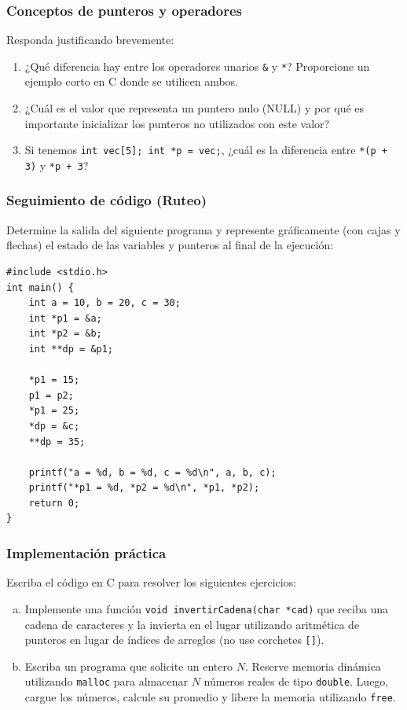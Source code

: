 \begin{ejercicioClase}
    \subsubsection{Conceptos de punteros y operadores}
    Responda justificando brevemente:
    \begin{enumerate}[label=\alph*)]
        \item ¿Qué diferencia hay entre los operadores unarios \texttt{\&} y \texttt{*}? Proporcione un ejemplo corto en C donde se utilicen ambos.
        \item ¿Cuál es el valor que representa un puntero nulo (NULL) y por qué es importante inicializar los punteros no utilizados con este valor?
        \item Si tenemos \texttt{int vec[5]; int *p = vec;}, ¿cuál es la diferencia entre \texttt{*(p + 3)} y \texttt{*p + 3}?
    \end{enumerate}

    \subsubsection{Seguimiento de código (Ruteo)}
    Determine la salida del siguiente programa y represente gráficamente (con cajas y flechas) el estado de las variables y punteros al final de la ejecución:
    \begin{lstlisting}[style=customc, basicstyle=\ttfamily\small]
#include <stdio.h>
int main() {
    int a = 10, b = 20, c = 30;
    int *p1 = &a;
    int *p2 = &b;
    int **dp = &p1;

    *p1 = 15;
    p1 = p2;
    *p1 = 25;
    *dp = &c;
    **dp = 35;

    printf("a = %d, b = %d, c = %d\n", a, b, c);
    printf("*p1 = %d, *p2 = %d\n", *p1, *p2);
    return 0;
}
    \end{lstlisting}

    \subsubsection{Implementación práctica}
    Escriba el código en C para resolver los siguientes ejercicios:
    \begin{enumerate}[a)]
        \item Implemente una función \texttt{void invertirCadena(char *cad)} que reciba una cadena de caracteres y la invierta en el lugar utilizando aritmética de punteros en lugar de índices de arreglos (no use corchetes \texttt{[]}).
        \item Escriba un programa que solicite un entero $N$. Reserve memoria dinámica utilizando \texttt{malloc} para almacenar $N$ números reales de tipo \texttt{double}. Luego, cargue los números, calcule su promedio y libere la memoria utilizando \texttt{free}.
    \end{enumerate}
\end{ejercicioClase}

